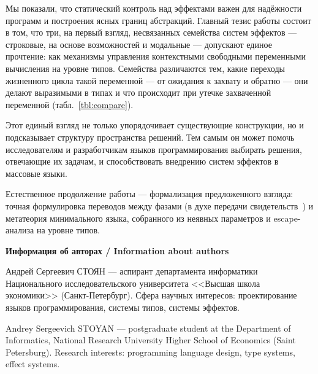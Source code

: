 \documentclass{ProcISPRAS}
\begin{document}
Мы показали, что статический контроль над эффектами важен для надёжности программ и
построения ясных границ абстракций. Главный тезис работы состоит в том, что три, на
первый взгляд, несвязанных семейства систем эффектов --- строковые, на основе
возможностей и модальные --- допускают единое прочтение: как механизмы управления
контекстными свободными переменными вычисления на уровне типов. Семейства различаются
тем, какие переходы жизненного цикла такой переменной --- от ожидания к захвату и обратно
--- они делают выразимыми в типах и что происходит при утечке захваченной переменной (табл.~\ref{tbl:compare}).

Этот единый взгляд не только упорядочивает существующие конструкции, но и подсказывает
структуру пространства решений. Тем самым он может помочь исследователям и разработчикам
языков программирования выбирать решения, отвечающие их задачам, и способствовать
внедрению систем эффектов в массовые языки.

Естественное продолжение работы --- формализация предложенного взгляда: точная
формулировка переводов между фазами (в духе передачи
свидетельств~\cite{xie2021generalized}) и метатеория минимального языка, собранного из
неявных параметров и escape-анализа на уровне типов.


\maketitleen

\begin{otherlanguage}{english}
\printbibliography
\end{otherlanguage}

{\vskip 12pt\normalfont\sffamily\bfseries\large Информация об авторах / Information about authors}
\setlength{\parskip}{6pt}

Андрей Сергеевич СТОЯН --- аспирант департамента информатики Национального
исследовательского университета <<Высшая школа экономики>> (Санкт-Петербург). Сфера
научных интересов: проектирование языков программирования, системы типов, системы
эффектов.

Andrey Sergeevich STOYAN --- postgraduate student at the Department of Informatics, National
Research University Higher School of Economics (Saint Petersburg). Research interests:
programming language design, type systems, effect systems.
\end{document}
